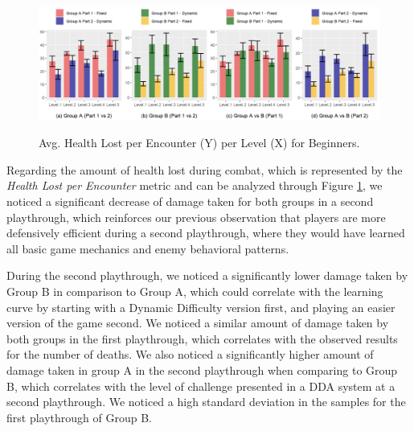 \begin{figure}[ht]
    \begin{center}
    \caption{Avg. Health Lost per Encounter (Y) per Level (X) for Beginners.}
        \includegraphics[width=\textwidth]{figures/health_lost_per_encounter-beginner_players.png}
        \label{fig:result-metric-beginners-health-lost-per-encounter}
    \end{center}
\end{figure}

Regarding the amount of health lost during combat, which is represented by the \emph{Health Lost per Encounter} metric and can be analyzed through Figure \ref{fig:result-metric-beginners-health-lost-per-encounter}, we noticed a significant decrease of damage taken for both groups in a second playthrough, which reinforces our previous observation that players are more defensively efficient during a second playthrough, where they would have learned all basic game mechanics and enemy behavioral patterns.

During the second playthrough, we noticed a significantly lower damage taken by Group B in comparison to Group A, which could correlate with the learning curve by starting with a Dynamic Difficulty version first, and playing an easier version of the game second. We noticed a similar amount of damage taken by both groups in the first playthrough, which correlates with the observed results for the number of deaths. We also noticed a significantly higher amount of damage taken in group A in the second playthrough when comparing to Group B, which correlates with the level of challenge presented in a DDA system at a second playthrough. We noticed a high standard deviation in the samples for the first playthrough of Group B.


